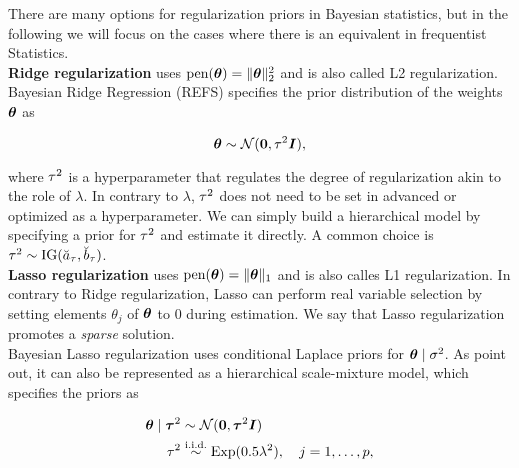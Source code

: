 
There are many options for regularization priors in Bayesian statistics, but in the following we will focus on the cases where there is an equivalent in frequentist Statistics.\\

\textbf{Ridge regularization} uses $\text{pen}(\bm{\theta}) = \|\bm{\theta}\|_2^2$ and is also called L2 regularization.
Bayesian Ridge Regression (REFS) specifies the prior distribution of the weights $\bm{\theta}$ as

\begin{equation*}
    \bm{\theta} \sim \mathcal{N}(\bm{0}, \tau^2 \bm{I}),
\end{equation*}

where $\tau^2$ is a hyperparameter that regulates the degree of regularization akin to the role of $\lambda$.
In contrary to $\lambda$, $\tau^2$ does not need to be set in advanced or optimized as a hyperparameter. We can simply build a hierarchical model by specifying a prior for $\tau^2$ and estimate it directly.
A common choice is $\tau^2 \sim \text{IG}(\breve{a}_\tau, \breve{b}_\tau)$. \\

\textbf{Lasso regularization} uses $\text{pen}(\bm{\theta}) = \|\bm{\theta}\|_1$ and is also calles L1 regularization.
In contrary to Ridge regularization, Lasso can perform real variable selection by setting elements $\theta_j$ of $\bm{\theta}$ to $0$ during estimation. We say that Lasso regularization promotes a \textit{sparse} solution. \\

Bayesian Lasso regularization uses conditional Laplace priors for $\bm{\theta} \mid \sigma^2$. As \citet{park_bayesian_2008} point out, it can also be represented as a hierarchical scale-mixture model, which specifies the priors as

\begin{equation}
    \begin{aligned}
        \bm{\theta} \mid \bm{\tau}^2 &\sim \mathcal{N}(\bm{0}, \bm{\tau}^2 \bm{I}) \\
        \tau^2 &\overset{\text{i.i.d.}}{\sim} \text{Exp}(0.5 \lambda^2), \quad j = 1, \dots, p,
    \end{aligned}
\end{equation}

